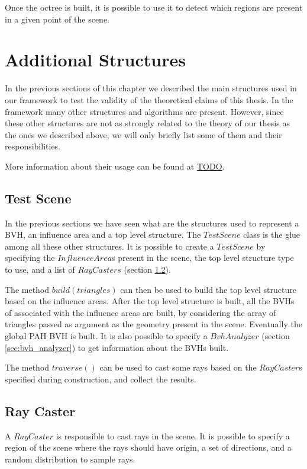 \documentclass{PoliMi_MasterThesis}
\begin{document}
Once the octree is built, it is possible to use it to detect which regions are present in a given point of the scene.

\section{Additional Structures} \label{sec:additional_structures}
In the previous sections of this chapter we described the main structures used in our framework to test the validity of the theoretical claims of this thesis. In the framework many other structures and algorithms are present. However, since these other structures are not as strongly related to the theory of our thesis as the ones we described above, we will only briefly list some of them and their responsibilities.

More information about their usage can be found at \url{TODO}.

\subsection{Test Scene}
In the previous sections we have seen what are the structures used to represent a BVH, an influence area and a top level structure. The $TestScene$ class is the glue among all these other structures. It is possible to create a $TestScene$ by specifying the $InfluenceArea$s present in the scene, the top level structure type to use, and a list of $RayCasters$ (section \ref{ssec:ray_caster}).

The method $build(triangles)$ can then be used to build the top level structure based on the influence areas. After the top level structure is built, all the BVHs of associated with the influence areas are built, by considering the array of triangles passed as argument as the geometry present in the scene. Eventually the global PAH BVH is built. It is also possible to specify a $BvhAnalyzer$ (section \ref{sec:bvh_analyzer}) to get information about the BVHs built.

The method $traverse()$ can be used to cast some rays based on the $RayCaster$s specified during construction, and collect the results.

\subsection{Ray Caster} \label{ssec:ray_caster}
A $RayCaster$ is responsible to cast rays in the scene. It is possible to specify a region of the scene where the rays should have origin, a set of directions, and a random distribution to sample rays.
\end{document}
